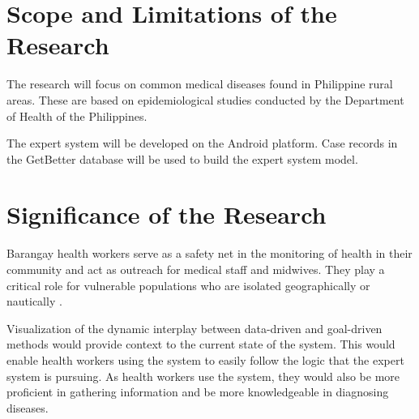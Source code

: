 \section{Scope and Limitations of the Research}
\label{sec:scopelimitations}

The research will focus on common medical diseases found in Philippine rural areas. These are based on epidemiological studies conducted by the Department of Health of the Philippines.

The expert system will be developed on the Android platform. Case records in the GetBetter database will be used to build the expert system model. 

\section{Significance of the Research}
\label{sec:significance}

Barangay health workers serve as a safety net in the monitoring of health in their community and act as outreach for medical staff and midwives.
They play a critical role for vulnerable populations who are isolated geographically or nautically \cite{DirectRelief:2014}.

Visualization of the dynamic interplay between data-driven and goal-driven methods would provide context to the current state of the system.
This would enable health workers using the system to easily follow the logic that the expert system is pursuing. 
As health workers use the system, they would also be more proficient in gathering information and be more knowledgeable in diagnosing diseases.
